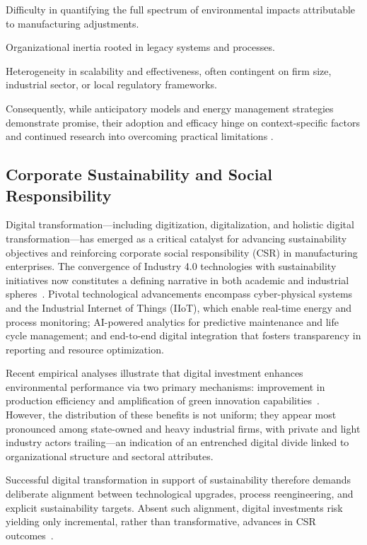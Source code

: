 \documentclass[sigconf]{acmart}
\begin{document}
Difficulty in quantifying the full spectrum of environmental impacts attributable to manufacturing adjustments.

Organizational inertia rooted in legacy systems and processes.

Heterogeneity in scalability and effectiveness, often contingent on firm size, industrial sector, or local regulatory frameworks.

Consequently, while anticipatory models and energy management strategies demonstrate promise, their adoption and efficacy hinge on context-specific factors and continued research into overcoming practical limitations \cite{ref80}.

\subsection{Corporate Sustainability and Social Responsibility}

Digital transformation—including digitization, digitalization, and holistic digital transformation—has emerged as a critical catalyst for advancing sustainability objectives and reinforcing corporate social responsibility (CSR) in manufacturing enterprises. The convergence of Industry 4.0 technologies with sustainability initiatives now constitutes a defining narrative in both academic and industrial spheres~\cite{ref16}\cite{ref18}\cite{ref26}\cite{ref27}\cite{ref29}\cite{ref40}\cite{ref41}\cite{ref42}\cite{ref43}. Pivotal technological advancements encompass cyber-physical systems and the Industrial Internet of Things (IIoT), which enable real-time energy and process monitoring; AI-powered analytics for predictive maintenance and life cycle management; and end-to-end digital integration that fosters transparency in reporting and resource optimization.

Recent empirical analyses illustrate that digital investment enhances environmental performance via two primary mechanisms: improvement in production efficiency and amplification of green innovation capabilities~\cite{ref41}. However, the distribution of these benefits is not uniform; they appear most pronounced among state-owned and heavy industrial firms, with private and light industry actors trailing—an indication of an entrenched digital divide linked to organizational structure and sectoral attributes.

Successful digital transformation in support of sustainability therefore demands deliberate alignment between technological upgrades, process reengineering, and explicit sustainability targets. Absent such alignment, digital investments risk yielding only incremental, rather than transformative, advances in CSR outcomes~\cite{ref43}.
\end{document}

